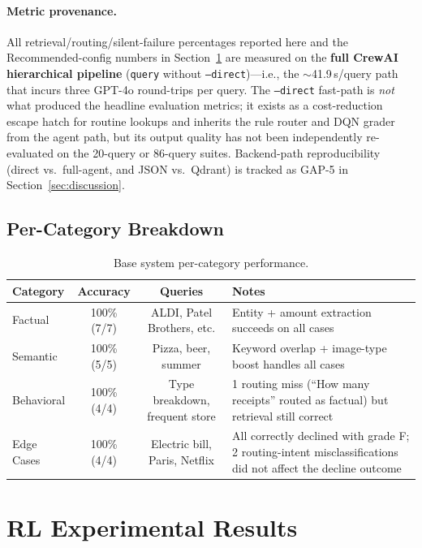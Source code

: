\documentclass[11pt,letterpaper]{article}
\begin{document}
\paragraph{Metric provenance.} All retrieval/routing/silent-failure percentages reported here and the Recommended-config numbers in Section~\ref{sec:results} are measured on the \textbf{full CrewAI hierarchical pipeline} (\texttt{query} without \texttt{--direct})---i.e., the $\sim$41.9\,s/query path that incurs three GPT-4o round-trips per query. The \texttt{--direct} fast-path is \emph{not} what produced the headline evaluation metrics; it exists as a cost-reduction escape hatch for routine lookups and inherits the rule router and DQN grader from the agent path, but its output quality has not been independently re-evaluated on the 20-query or 86-query suites. Backend-path reproducibility (direct vs.\ full-agent, and JSON vs.\ Qdrant) is tracked as GAP-5 in Section~\ref{sec:discussion}.

\subsection{Per-Category Breakdown}

\begin{table}[H]
\centering
\begin{tabular}{lccp{6cm}}
\toprule
\textbf{Category} & \textbf{Accuracy} & \textbf{Queries} & \textbf{Notes} \\
\midrule
Factual & 100\% (7/7) & ALDI, Patel Brothers, etc. & Entity + amount extraction succeeds on all cases \\
Semantic & 100\% (5/5) & Pizza, beer, summer & Keyword overlap + image-type boost handles all cases \\
Behavioral & 100\% (4/4) & Type breakdown, frequent store & 1 routing miss (``How many receipts'' routed as factual) but retrieval still correct \\
Edge Cases & 100\% (4/4) & Electric bill, Paris, Netflix & All correctly declined with grade F; 2 routing-intent misclassifications did not affect the decline outcome \\
\bottomrule
\end{tabular}
\caption{Base system per-category performance.}
\end{table}

\section{RL Experimental Results}
\label{sec:results}
\end{document}
